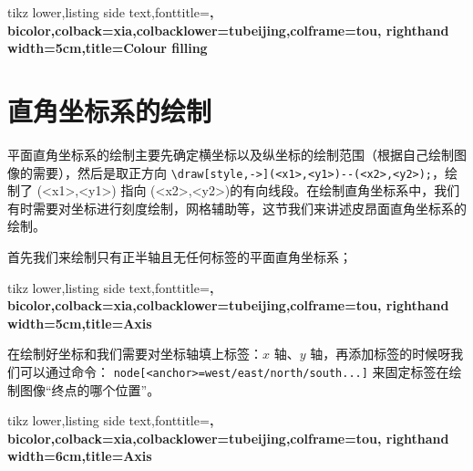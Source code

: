 \documentclass[cn,11pt, simple]{elegantbook}
\begin{document}
\begin{tcblisting}{tikz lower,listing side text,fonttitle=\bfseries,
	bicolor,colback=xia,colbacklower=tubeijing,colframe=tou,
	righthand width=5cm,title=Colour filling}
\end{tcblisting}

\section{直角坐标系的绘制}

平面直角坐标系的绘制主要先确定横坐标以及纵坐标的绘制范围（根据自己绘制图像的需要），然后是取正方向 \verb|\draw[style,->](<x1>,<y1>)--(<x2>,<y2>);|，绘制了 (<x1>,<y1>) 指向 (<x2>,<y2>)的有向线段。在绘制直角坐标系中，我们有时需要对坐标进行刻度绘制，网格辅助等，这节我们来讲述皮昂面直角坐标系的绘制。

首先我们来绘制只有正半轴且无任何标签的平面直角坐标系；

\begin{tcblisting}{tikz lower,listing side text,fonttitle=\bfseries,
	bicolor,colback=xia,colbacklower=tubeijing,colframe=tou,
	righthand width=5cm,title=Axis}
\end{tcblisting}

\begin{tcolorbox}
	在绘制好坐标和我们需要对坐标轴填上标签：$x$ 轴、$y$ 轴，再添加标签的时候呀我们可以通过命令： \verb|node[<anchor>=west/east/north/south...]| 来固定标签在绘制图像“终点的哪个位置”。
\end{tcolorbox}

\begin{tcblisting}{tikz lower,listing side text,fonttitle=\bfseries,
	bicolor,colback=xia,colbacklower=tubeijing,colframe=tou,
	righthand width=6cm,title=Axis}
\end{tcblisting}
\end{document}
